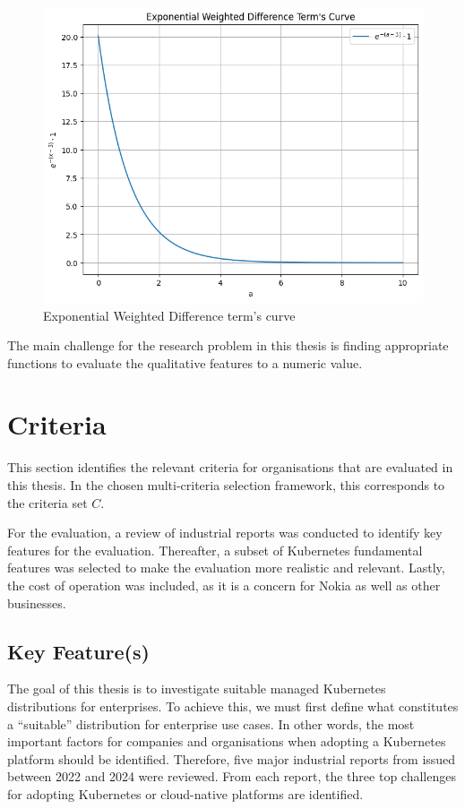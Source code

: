 \begin{figure}
    \centering
    \includegraphics[width=0.75\linewidth]{resources/example exponential function.png}
    \caption{Exponential Weighted Difference term's curve}
    \label{fig:example-exp-func-graph}
\end{figure}

The main challenge for the research problem in this thesis is finding
appropriate functions to evaluate the qualitative features to a numeric
value.

\section{Criteria}\label{evaluation-criteria}

This section identifies the relevant criteria for organisations that are evaluated in this thesis. In the chosen multi-criteria selection framework, this corresponds to the criteria set $C$.

For the evaluation, a review of industrial reports was conducted to identify key features for the evaluation. Thereafter, a subset of Kubernetes fundamental features was selected to make the evaluation more realistic and relevant. Lastly, the cost of operation was included, as it is a concern for Nokia as well as other businesses.

\subsection{Key Feature(s)}\label{key-features-for-evaluation}


The goal of this thesis is to investigate suitable managed Kubernetes distributions for enterprises. To achieve this, we must first define what constitutes a “suitable” distribution for enterprise use cases. In other words, the most important factors for companies and organisations when adopting a Kubernetes platform should be identified. Therefore, five major industrial reports from issued between 2022 and 2024 were reviewed. From each report, the three top challenges for adopting Kubernetes or cloud-native platforms are identified.

